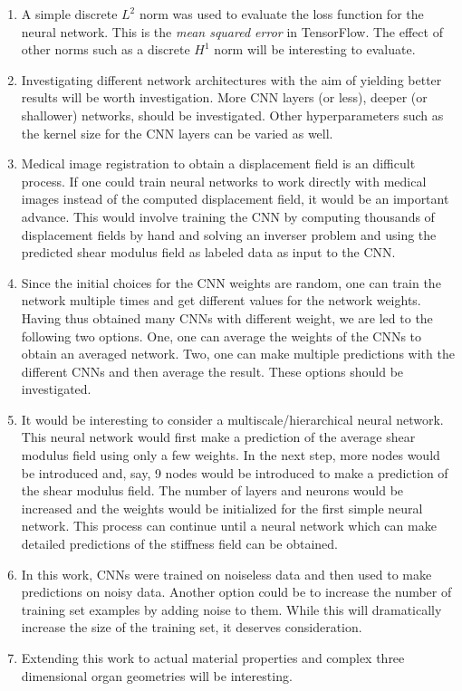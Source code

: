 \documentclass[12pt]{article}
\begin{document}
\begin{enumerate}
\item{A simple discrete $L^2$ norm was used to evaluate the loss function for the neural network. This is the \textit{mean squared error} in TensorFlow. The effect of other norms such as a discrete $H^1$ norm will be interesting to evaluate.}
\item{Investigating different network architectures with the aim of yielding better results will be worth investigation. More CNN layers (or less), deeper (or shallower) networks, should be investigated. Other hyperparameters such as the kernel size for the CNN layers can be varied as well.}
\item{Medical image registration to obtain a displacement field is an difficult process. If one could train neural networks to work directly with medical images instead of the computed displacement field, it would be an important advance. This would involve training the CNN by computing thousands of displacement fields by hand and solving an inverser problem and using the predicted shear modulus field as labeled data as input to the CNN.}
\item{Since the initial choices for the CNN weights are random, one can train the network multiple times and get different values for the network weights. Having thus obtained many CNNs with different weight, we are led to the following two options. One, one can average the weights of the CNNs to obtain an averaged network. Two, one can make multiple predictions with the different CNNs and then average the result. These options should be investigated.}
\item{It would be interesting to consider a multiscale/hierarchical neural network. This neural network would first make a prediction of the average shear modulus field using only a few weights. In the next step, more nodes would be introduced and, say, 9 nodes would be introduced to make a prediction of the shear modulus field. The number of layers and neurons would be increased and the weights would be initialized for the first simple neural network. This process can continue until a neural network which can make detailed predictions of the stiffness field can be obtained. }
\item{In this work, CNNs were trained on noiseless data and then used to make predictions on noisy data. Another option could be to increase the number of training set examples by adding noise to them. While this will dramatically increase the size of the training set, it deserves consideration.}
\item{Extending this work to actual material properties and complex three dimensional organ geometries will be interesting. }

\end{enumerate}
\end{document}
